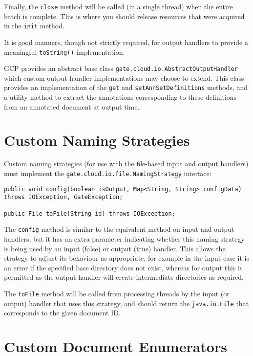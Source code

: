 Finally, the \verb!close! method will be called (in a single thread) when the
entire batch is complete.  This is where you should release resources that were
acquired in the \verb!init! method.

It is good manners, though not strictly required, for output handlers to
provide a meaningful \verb!toString()! implementation.

GCP provides an abstract base class \verb!gate.cloud.io.AbstractOutputHandler!
which custom output handler implementations may choose to extend.  This class
provides an implementation of the \verb!get! and \verb!setAnnSetDefinitions!
methods, and a utility method to extract the annotations corresponding to these
definitions from an annotated document at output time.

\section{Custom Naming Strategies}

Custom naming strategies (for use with the file-based input and output
handlers) must implement the \verb!gate.cloud.io.file.NamingStrategy!
interface:

\begin{lstlisting}[breaklines]
public void config(boolean isOutput, Map<String, String> configData) throws IOException, GateException;

public File toFile(String id) throws IOException;
\end{lstlisting}

The \verb!config! method is similar to the equivalent method on input and
output handlers, but it has an extra parameter indicating whether this naming
strategy is being used by an input (false) or output (true) handler.  This
allows the strategy to adjust its behaviour as appropriate, for example in the
input case it is an error if the specified base directory does not exist,
whereas for output this is permitted as the output handler will create
intermediate directories as required.

The \verb!toFile! method will be called from processing threads by the input
(or output) handler that uses this strategy, and should return the
\verb!java.io.File! that corresponds to the given document ID.


\section{Custom Document Enumerators}

